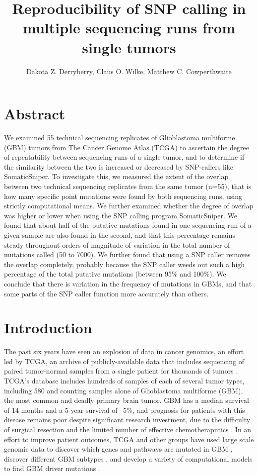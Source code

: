 \documentclass[11pt]{article} %
\title{Reproducibility of SNP calling in multiple sequencing runs from single tumors}
\author{Dakota Z. Derryberry, Claus O. Wilke, Matthew C. Cowperthwaite} %
\begin{document}
\maketitle

\section*{Abstract}

We examined 55 technical sequencing replicates of Glioblastoma multiforme (GBM) tumors from The Cancer Genome Atlas (TCGA) to ascertain the degree of repeatability between sequencing runs of a single tumor, and to determine if the similarity between the two is increased or decreased by SNP-callers like SomaticSniper. To investigate this, we measured the extent of the overlap between two technical sequencing replicates from the same tumor (n=55), that is how many specific point mutations were found by both sequencing runs, using strictly computational means. We further examined whether the degree of overlap was higher or lower when using the SNP calling program SomaticSniper.  We found that about half of the putative mutations found in one sequencing run of a given sample are also found in the second, and that this percentage remains steady throughout orders of magnitude of variation in the total number of mutations called (50 to 7000). We further found that using a SNP caller removes the overlap completely, probably because the SNP caller weeds out such a high percentage of the total putative mutations (between 95\% and 100\%). We conclude that there is variation in the frequency of mutations in GBMs, and that some parts of the SNP caller function more accurately than others.

\section*{Introduction}

The past six years have seen an explosion of data in cancer genomics, an effort led by TCGA, an archive of publicly-available data that includes sequencing of paired tumor-normal samples from a single patient for thousands of tumors \cite{TCGA-GBM, TCGA-GBM-13}. TCGA's database includes hundreds of samples of each of several tumor types, including 580 and counting samples alone of Glioblastoma multiforme (GBM), the most common and deadly primary brain tumor. GBM has a median survival of 14 months and a 5-year survival of ~5\%, and prognosis for patients with this disease remains poor despite significant research investment, due to the difficulty of surgical resection and the limited number of effective chemotheraputics \cite{GBM-stats}. In an effort to improve patient outcomes, TCGA and other groups \cite{Parsons} have used large scale genomic data to discover which genes and pathways are mutated in GBM \cite{pathways}, discover different GBM subtypes \cite{subtypes}, and develop a variety of computational models to find GBM driver mutations \cite{drivers}.
\end{document}
